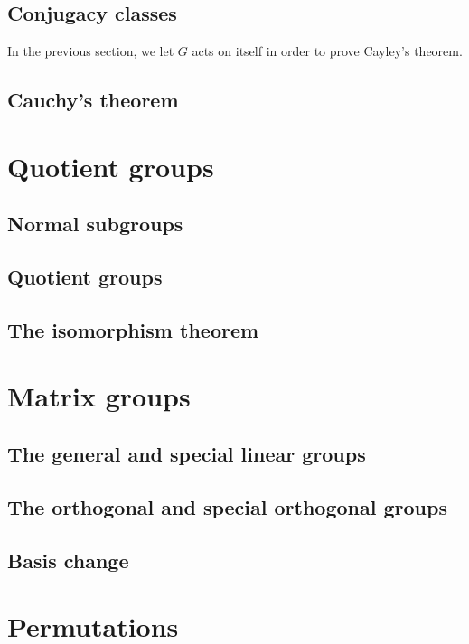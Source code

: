 \documentclass[main.tex]{subfiles}
\begin{document}
			\subsection{Conjugacy classes}
				In the previous section, we let $G$ acts on itself in order to prove Cayley's theorem.
			\subsection{Cauchy's theorem}
			
		\section{Quotient groups}
			\subsection{Normal subgroups}
			
			\subsection{Quotient groups}
			
			\subsection{The isomorphism theorem}
			
		\section{Matrix groups}
			\subsection{The general and special linear groups}
			
			\subsection{The orthogonal and special orthogonal groups}
			
			\subsection{Basis change}
			
		\section{Permutations}
\end{document}
